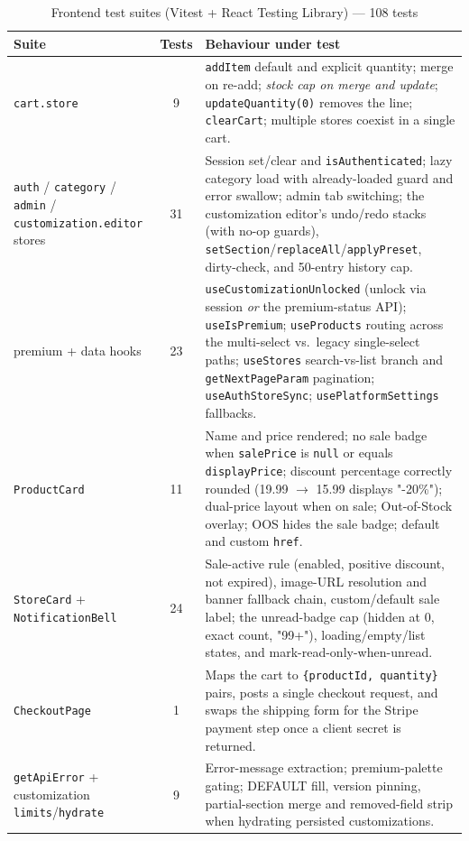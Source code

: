 \documentclass[12pt, a4paper, oneside]{report}
\begin{document}
\begin{table}[H]
\centering
\small
\setlength{\tabcolsep}{8pt}
\setlength{\extrarowheight}{3pt}
\renewcommand{\arraystretch}{1.4}
\begin{tabular}{|>{\raggedright\arraybackslash}p{3.8cm}|c|>{\raggedright\arraybackslash}p{6.8cm}|}
\hline
\rowcolor{cheebolightgray}
\textbf{Suite} & \textbf{Tests} & \textbf{Behaviour under test} \\
\hline
\texttt{cart.store} & 9 & \texttt{addItem} default and explicit quantity; merge on re-add; \emph{stock cap on merge and update}; \texttt{updateQuantity(0)} removes the line; \texttt{clearCart}; multiple stores coexist in a single cart. \\
\hline
\texttt{auth} / \texttt{category} / \texttt{admin} / \texttt{customization.editor} stores & 31 & Session set/clear and \texttt{isAuthenticated}; lazy category load with already-loaded guard and error swallow; admin tab switching; the customization editor's undo/redo stacks (with no-op guards), \texttt{setSection}/\texttt{replaceAll}/\texttt{applyPreset}, dirty-check, and 50-entry history cap. \\
\hline
premium + data hooks & 23 & \texttt{useCustomizationUnlocked} (unlock via session \emph{or} the premium-status API); \texttt{useIsPremium}; \texttt{useProducts} routing across the multi-select vs.\ legacy single-select paths; \texttt{useStores} search-vs-list branch and \texttt{getNextPageParam} pagination; \texttt{useAuthStoreSync}; \texttt{usePlatformSettings} fallbacks. \\
\hline
\texttt{ProductCard} & 11 & Name and price rendered; no sale badge when \texttt{salePrice} is \texttt{null} or equals \texttt{displayPrice}; discount percentage correctly rounded (19.99 $\to$ 15.99 displays "-20\%"); dual-price layout when on sale; Out-of-Stock overlay; OOS hides the sale badge; default and custom \texttt{href}. \\
\hline
\texttt{StoreCard} + \texttt{NotificationBell} & 24 & Sale-active rule (enabled, positive discount, not expired), image-URL resolution and banner fallback chain, custom/default sale label; the unread-badge cap (hidden at 0, exact count, "99+"), loading/empty/list states, and mark-read-only-when-unread. \\
\hline
\texttt{CheckoutPage} & 1 & Maps the cart to \texttt{\{productId, quantity\}} pairs, posts a single checkout request, and swaps the shipping form for the Stripe payment step once a client secret is returned. \\
\hline
\texttt{getApiError} + customization \texttt{limits}/\texttt{hydrate} & 9 & Error-message extraction; premium-palette gating; DEFAULT fill, version pinning, partial-section merge and removed-field strip when hydrating persisted customizations. \\
\hline
\end{tabular}
\caption{Frontend test suites (Vitest + React Testing Library) --- 108 tests}
\label{tab:frontend-tests}
\end{table}
\end{document}
